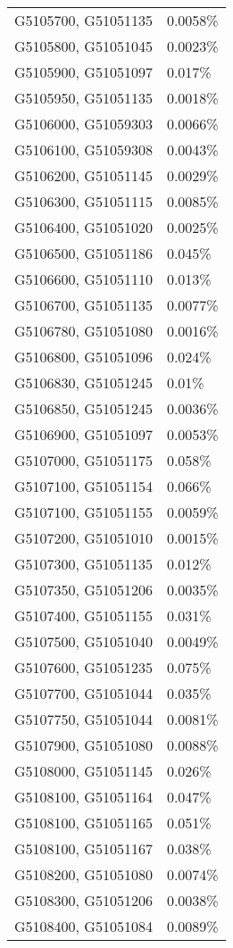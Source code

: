 \begin{longtable}[]{@{}ll@{}}
G5105700, G51051135 & 0.0058\% \\
G5105800, G51051045 & 0.0023\% \\
G5105900, G51051097 & 0.017\% \\
G5105950, G51051135 & 0.0018\% \\
G5106000, G51059303 & 0.0066\% \\
G5106100, G51059308 & 0.0043\% \\
G5106200, G51051145 & 0.0029\% \\
G5106300, G51051115 & 0.0085\% \\
G5106400, G51051020 & 0.0025\% \\
G5106500, G51051186 & 0.045\% \\
G5106600, G51051110 & 0.013\% \\
G5106700, G51051135 & 0.0077\% \\
G5106780, G51051080 & 0.0016\% \\
G5106800, G51051096 & 0.024\% \\
G5106830, G51051245 & 0.01\% \\
G5106850, G51051245 & 0.0036\% \\
G5106900, G51051097 & 0.0053\% \\
G5107000, G51051175 & 0.058\% \\
G5107100, G51051154 & 0.066\% \\
G5107100, G51051155 & 0.0059\% \\
G5107200, G51051010 & 0.0015\% \\
G5107300, G51051135 & 0.012\% \\
G5107350, G51051206 & 0.0035\% \\
G5107400, G51051155 & 0.031\% \\
G5107500, G51051040 & 0.0049\% \\
G5107600, G51051235 & 0.075\% \\
G5107700, G51051044 & 0.035\% \\
G5107750, G51051044 & 0.0081\% \\
G5107900, G51051080 & 0.0088\% \\
G5108000, G51051145 & 0.026\% \\
G5108100, G51051164 & 0.047\% \\
G5108100, G51051165 & 0.051\% \\
G5108100, G51051167 & 0.038\% \\
G5108200, G51051080 & 0.0074\% \\
G5108300, G51051206 & 0.0038\% \\
G5108400, G51051084 & 0.0089\% \\

\end{longtable}
